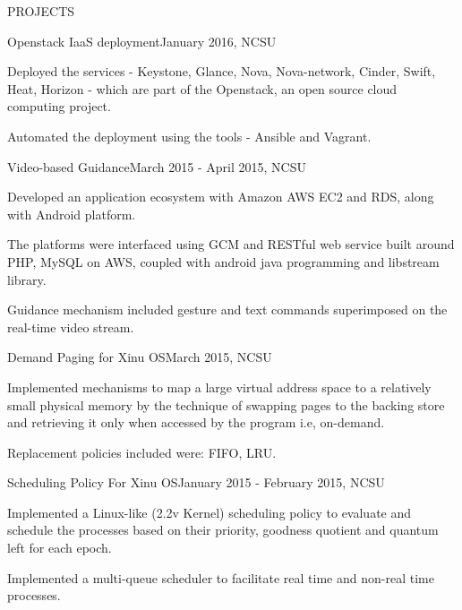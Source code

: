 \documentclass{resume} %
\begin{document}
\begin{rSection}{PROJECTS}
    
    \begin{rSubsectionProject}{Openstack IaaS deployment}{January 2016, NCSU}
    	\item Deployed the services - Keystone, Glance, Nova, Nova-network, Cinder, Swift, Heat, Horizon - which are part of the Openstack, an open source cloud computing project.
        \item Automated the deployment using the tools - Ansible and Vagrant.
    \end{rSubsectionProject}
    
    \begin{rSubsectionProject}{Video-based Guidance}{March 2015 - April 2015, NCSU}
    	\item Developed an application ecosystem with Amazon AWS EC2 and RDS, along with Android platform.
        \item The platforms were interfaced using GCM and RESTful web service built around PHP, MySQL on AWS, coupled with android java programming and libstream library.
       \item Guidance mechanism included gesture and text commands superimposed on the real-time video stream.
    \end{rSubsectionProject}
    
    \begin{rSubsectionProject}{Demand Paging for Xinu OS}{March 2015, NCSU}
    	\item Implemented mechanisms to map a large virtual address space to a relatively small physical memory by the technique of swapping pages to the backing store and retrieving it only when accessed by the program i.e, on-demand.
    	\item Replacement policies included were: FIFO, LRU.
    \end{rSubsectionProject}
    
    \begin{rSubsectionProject}{Scheduling Policy For Xinu OS}{January 2015 - February 2015, NCSU}
    	\item Implemented a Linux-like (2.2v Kernel) scheduling policy to evaluate and schedule the processes  based on their priority, goodness quotient and quantum left for each epoch.
        \item Implemented a multi-queue scheduler to facilitate real time and non-real time processes. 
    \end{rSubsectionProject}
    

\end{rSection}
\end{document}
